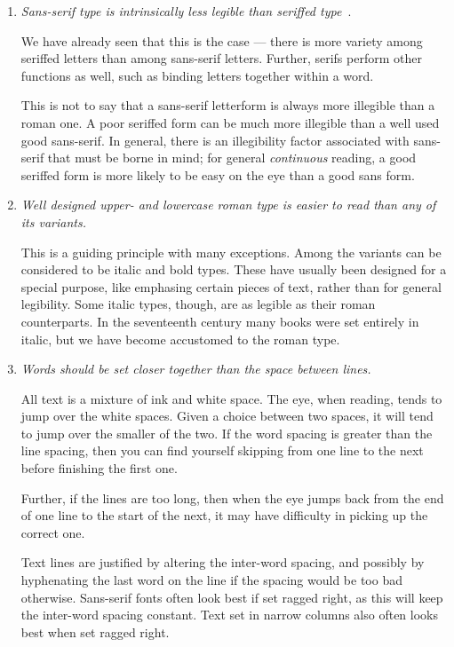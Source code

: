 \documentclass[10pt,letterpaper,extrafontsizes]{memoir}
\begin{document}
\begin{enumerate}
\item \emph{Sans-serif type is intrinsically less legible than seriffed type}~\autocite{WHEILDON95}.

    We have already seen that this is the case --- there is more variety
among seriffed letters than among sans-serif letters. Further, serifs
perform other functions as well, such as binding letters together within
a word.

    This is not to say that a sans-serif letterform is always more illegible
than a roman one. A poor seriffed form can be much more illegible than
a well used good sans-serif. In general, there is an illegibility factor
associated with sans-serif that must be borne in mind; for general
\emph{continuous} reading, a good seriffed form is more likely to be
easy on the eye than a good sans form.

\item \emph{Well designed upper- and lowercase roman type is easier to read than
any of its variants.}

    This is a guiding principle with many exceptions. Among the variants
can be considered to be italic and bold types. These have usually been
designed for a special purpose, like emphasing 
certain pieces of text, rather
than for general legibility. Some italic types, though, are as legible as their
roman counterparts. In the seventeenth century many books were set entirely
in italic, but we have become accustomed to the roman type.

\item \emph{Words should be set closer together than the space between lines.}

    All text is a mixture of ink and white space. The eye, when reading, 
tends to jump over the white spaces. Given a choice between two spaces, it 
will tend to jump over the smaller of the two. If the word spacing is greater
than the line spacing, then you can find yourself skipping from one line
to the next before finishing the first one.

    Further, if the lines are too long, then when the eye jumps back from
the end of one line to the start of the next, it may have difficulty in 
picking up the correct one.

    Text lines are justified by altering the inter-word spacing, and possibly
by hyphenating the last word on the line if the spacing would be too bad
otherwise. Sans-serif fonts often look best if set ragged right, as this will
keep the inter-word spacing constant. Text set in narrow 
columns also often
looks best when set ragged right.


\end{enumerate}
\end{document}
